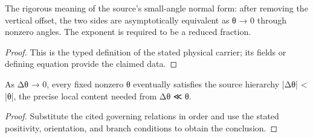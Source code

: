 \begin{definition}
  \label{def:physics:IPhO_2026_2_C_4:aux013}
  The rigorous meaning of the source's small-angle normal form: after removing the vertical offset, the two sides are asymptotically equivalent as θ → 0 through nonzero angles. The exponent is required to be a reduced fraction.
\end{definition}
\begin{proof}
  This is the typed definition of the stated physical carrier; its fields or defining equation provide the claimed data.
\end{proof}

\begin{lemma}
  \label{lem:physics:IPhO_2026_2_C_4:aux014}
  As Δθ → 0, every fixed nonzero θ eventually satisfies the source hierarchy |Δθ| < |θ|, the precise local content needed from Δθ ≪ θ.
\end{lemma}
\begin{proof}
  Substitute the cited governing relations in order and use the stated positivity, orientation, and branch conditions to obtain the conclusion.
\end{proof}
